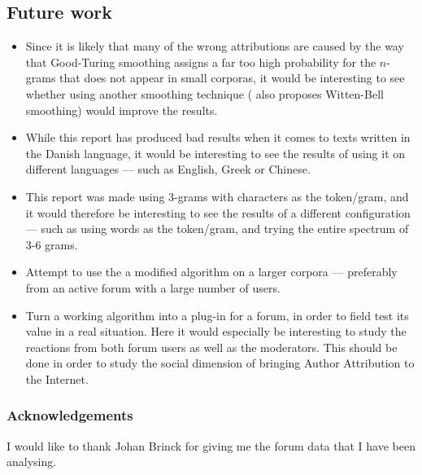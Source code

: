 \subsection{Future work}

\begin{itemize}
\item Since it is likely that many of the wrong attributions are caused by the way that Good-Turing smoothing assigns a far too high probability for the $n$-grams that does not appear in small corporas, it would be interesting to see whether using another smoothing technique (\cite{nr4} also proposes Witten-Bell smoothing) would improve the results.

\item While this report has produced bad results when it comes to texts written in the Danish language, it would be interesting to see the results of using it on different languages --- such as English, Greek or Chinese.

\item This report was made using 3-grams with characters as the token/gram, and it would therefore be interesting to see the results of a different configuration --- such as using words as the token/gram, and trying the entire spectrum of 3-6 grams. 

\item Attempt to use the a modified algorithm on a larger corpora --- preferably from an active forum with a large number of users. 

\item Turn a working algorithm into a plug-in for a forum, in order to field test its value in a real situation. Here it would especially be interesting to study the reactions from both forum users as well as the moderators. This should be done in order to study the social dimension of bringing Author Attribution to the Internet.
\end{itemize}  

\subsubsection*{Acknowledgements}
I would like to thank Johan Brinck for giving me the forum data that I have been analysing.
